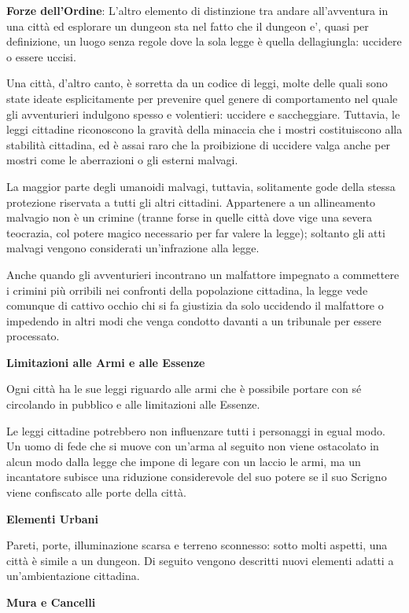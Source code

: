 \documentclass[a4paper,11pt,twoside,openany]{book}
\begin{document}
{\textbf{Forze dell'Ordine}: L'altro elemento di distinzione tra andare all'avventura in una città ed esplorare un dungeon sta nel fatto che il dungeon e', quasi per definizione, un luogo senza regole dove la sola legge è quella dellagiungla: uccidere o essere uccisi.

Una città, d'altro canto, è sorretta da un codice di leggi, molte delle quali sono state ideate esplicitamente per prevenire quel genere di comportamento nel quale gli avventurieri indulgono spesso e volentieri: uccidere e saccheggiare. Tuttavia, le leggi cittadine riconoscono la gravità della minaccia che i mostri costituiscono alla stabilità cittadina, ed è assai raro che la proibizione di uccidere valga anche per mostri come le aberrazioni o gli esterni malvagi.

La maggior parte degli umanoidi malvagi, tuttavia, solitamente gode della stessa protezione riservata a tutti gli altri cittadini. Appartenere a un allineamento malvagio non è un crimine (tranne forse in quelle città dove vige una severa teocrazia, col potere magico necessario per far valere la legge); soltanto gli atti malvagi vengono considerati un'infrazione alla legge. 

Anche quando gli avventurieri incontrano un malfattore impegnato a commettere i crimini più orribili nei confronti della popolazione cittadina, la legge vede comunque di cattivo occhio chi si fa giustizia da solo uccidendo il malfattore o impedendo in altri modi che venga condotto davanti a un tribunale per essere processato.

\textbf{Limitazioni alle Armi e alle Essenze}

Ogni città ha le sue leggi riguardo alle armi che è possibile portare con sé circolando in pubblico e alle limitazioni alle Essenze.

Le leggi cittadine potrebbero non influenzare tutti i personaggi in egual modo. Un uomo di fede che si muove con un'arma al seguito non viene ostacolato in alcun modo dalla legge che impone di legare con un laccio le armi, ma un incantatore subisce una riduzione considerevole del suo potere se il suo Scrigno viene confiscato alle porte della città.

\textbf{Elementi Urbani}

Pareti, porte, illuminazione scarsa e terreno sconnesso: sotto molti aspetti, una città è simile a un dungeon. Di seguito vengono descritti nuovi elementi adatti a un'ambientazione cittadina.

\textbf{Mura e Cancelli}

}
\end{document}
